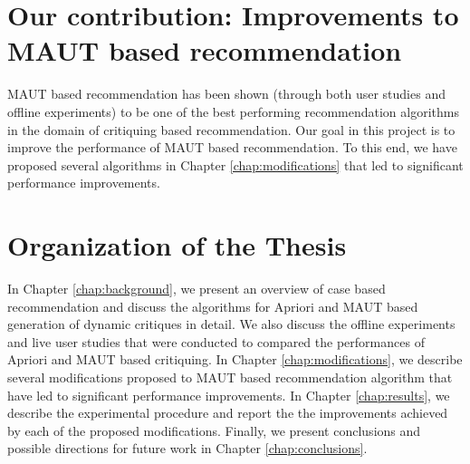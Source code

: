 \section{Our contribution: Improvements to MAUT based recommendation}
MAUT based recommendation has been shown (through both user studies and offline experiments) to be one of the best performing recommendation algorithms in the domain of critiquing based recommendation.
Our goal in this project is to improve the performance of MAUT based recommendation.
To this end, we have proposed several algorithms in Chapter \ref{chap:modifications} that led to significant performance improvements.

\section{Organization of the Thesis}
In Chapter \ref{chap:background}, we present an overview of case based recommendation and discuss the algorithms for Apriori and  MAUT based generation of dynamic critiques in detail. We also discuss the offline experiments and live user studies that were conducted to compared the performances of Apriori and MAUT based critiquing.
In Chapter \ref{chap:modifications}, we describe several modifications proposed to MAUT based recommendation algorithm that have led to significant performance improvements.
In Chapter \ref{chap:results}, we describe the experimental procedure and report the the improvements achieved by each of the proposed modifications.
Finally, we present conclusions and possible directions for future work in Chapter \ref{chap:conclusions}.
